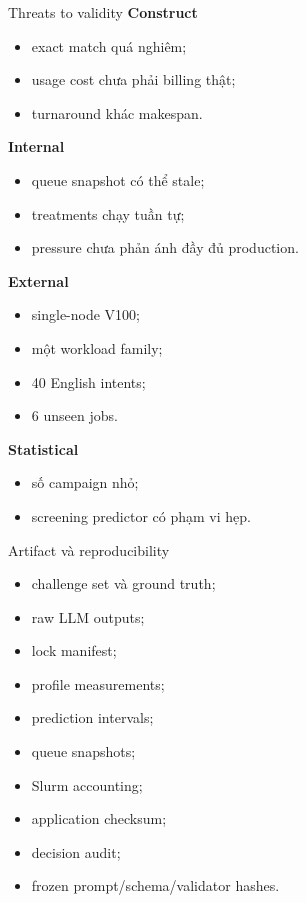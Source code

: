 \begin{frame}[t,shrink=20]{Threats to validity}
\scriptsize
\vspace{0.15em}
\textbf{Construct}\par
\begin{itemize}
\item exact match quá nghiêm;
\item usage cost chưa phải billing thật;
\item turnaround khác makespan.
\end{itemize}
\vspace{0.15em}
\textbf{Internal}\par
\begin{itemize}
\item queue snapshot có thể stale;
\item treatments chạy tuần tự;
\item pressure chưa phản ánh đầy đủ production.
\end{itemize}
\vspace{0.15em}
\textbf{External}\par
\begin{itemize}
\item single-node V100;
\item một workload family;
\item 40 English intents;
\item 6 unseen jobs.
\end{itemize}
\vspace{0.15em}
\textbf{Statistical}\par
\begin{itemize}
\item số campaign nhỏ;
\item screening predictor có phạm vi hẹp.
\end{itemize}
\end{frame}

\begin{frame}[t,shrink=20]{Artifact và reproducibility}
\scriptsize
\begin{itemize}
\item challenge set và ground truth;
\item raw LLM outputs;
\item lock manifest;
\item profile measurements;
\item prediction intervals;
\item queue snapshots;
\item Slurm accounting;
\item application checksum;
\item decision audit;
\item frozen prompt/schema/validator hashes.
\end{itemize}
\end{frame}
